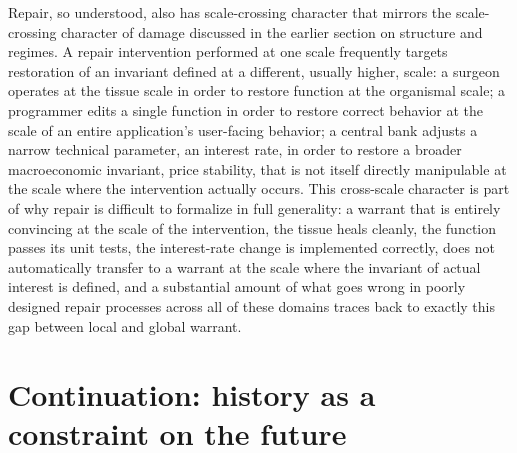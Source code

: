 \documentclass[11pt]{article}
\begin{document}
Repair, so understood, also has scale-crossing character that mirrors the scale-crossing character of damage discussed in the earlier section on structure and regimes. A repair intervention performed at one scale frequently targets restoration of an invariant defined at a different, usually higher, scale: a surgeon operates at the tissue scale in order to restore function at the organismal scale; a programmer edits a single function in order to restore correct behavior at the scale of an entire application's user-facing behavior; a central bank adjusts a narrow technical parameter, an interest rate, in order to restore a broader macroeconomic invariant, price stability, that is not itself directly manipulable at the scale where the intervention actually occurs. This cross-scale character is part of why repair is difficult to formalize in full generality: a warrant that is entirely convincing at the scale of the intervention, the tissue heals cleanly, the function passes its unit tests, the interest-rate change is implemented correctly, does not automatically transfer to a warrant at the scale where the invariant of actual interest is defined, and a substantial amount of what goes wrong in poorly designed repair processes across all of these domains traces back to exactly this gap between local and global warrant.

\section{Continuation: history as a constraint on the future}
\end{document}
